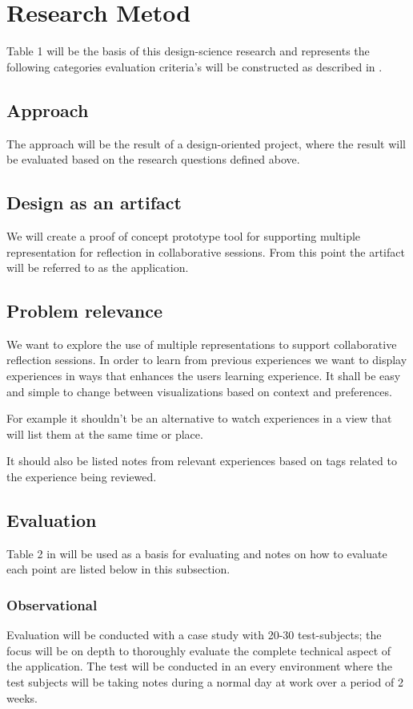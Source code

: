 \section{Research Metod}
Table 1 \cite{Esearch2004} will be the basis of this design-science research and represents the following categories evaluation criteria’s will be constructed as described in \cite{Esearch2004}.
\subsection{Approach}
The approach will be the result of a design-oriented project, where the result will be evaluated based on the research questions defined above.
\subsection{Design as an artifact}
We will create a proof of concept prototype tool for supporting multiple representation for reflection in collaborative sessions. From this point the artifact will be referred to as the application.
\subsection{Problem relevance}
We want to explore the use of multiple representations to support collaborative reflection sessions. In order to learn from previous experiences we want to display experiences in ways that enhances the users learning experience. It shall be easy and simple to change between visualizations based on context and preferences. 

For example it shouldn’t be an alternative to watch experiences in a view that will list them at the same time or place.

It should also be listed notes from relevant experiences based on tags related to the experience being reviewed. \cite{Hassan-montero2006}
\subsection{Evaluation}
Table 2 in \cite{Esearch2004} will be used as a basis for evaluating and notes on how to evaluate each point are listed below in this subsection.
\subsubsection{Observational}
Evaluation will be conducted with a case study with 20-30 test-subjects; the focus will be on depth to thoroughly evaluate the complete technical aspect of the application. The test will be conducted in an every environment where the test subjects will be taking notes during a normal day at work over a period of 2 weeks.

